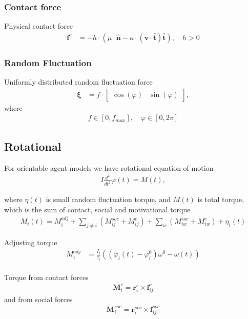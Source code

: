 \subsubsection{Contact force}
Physical contact force
\begin{align}
\mathbf{f}^{c} &= - h \cdot \left(\mu \cdot \hat{\mathbf{n}} - \kappa \cdot (\mathbf{v} \cdot \hat{\mathbf{t}}) \hat{\mathbf{t}}\right), \quad h > 0
\end{align}


\subsubsection{Random Fluctuation}
Uniformly distributed random fluctuation force
\begin{align}
\boldsymbol{\xi} &= f \cdot \begin{bmatrix} \cos(\varphi) & \sin(\varphi) \end{bmatrix},
\end{align}
where
\begin{align}
f \in [0, f_{max}],\quad \varphi \in [0, 2 \pi]
\end{align}


\subsection{Rotational}

For orientable agent models we have rotational equation of motion
\begin{align}
I \frac{d^{2}}{d t^{2}} \varphi(t) = M(t),
\end{align}

where $ \eta(t) $ is small random fluctuation torque, and $ M(t) $ is total torque, which is the sum of contact, social and motivational torque
\begin{align}
M_{i}(t) = M_{i}^{adj} + \sum_{j\neq i}^{} \left(M_{ij}^{soc} + M_{ij}^{c}\right) + \sum_{w}^{} \left(M_{iw}^{soc} + M_{iw}^{c}\right) + \eta_{i}(t)
\end{align}

Adjusting torque
\begin{align}
M_{i}^{adj} &= \frac{I_{i}}{\tau_{i}} \left((\varphi_{i}(t) - \varphi_{i}^{0}) \omega^{0} - \omega(t)\right) \\
\end{align}

Torque from contact forces
\begin{align}
\mathbf{M}_{i}^{c} = \mathbf{r}_{i}^{c} \times \mathbf{f}_{ij}^{c}
\end{align}
and from social forces
\begin{align}
\mathbf{M}_{i}^{soc} = \mathbf{r}_{i}^{soc} \times \mathbf{f}_{ij}^{soc}
\end{align}


